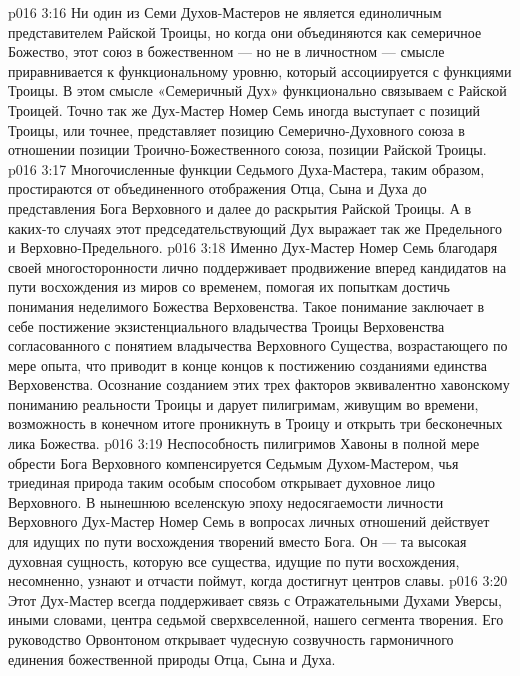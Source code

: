 \vs p016 3:16 Ни один из Семи Духов\hyp{}Мастеров не является единоличным представителем Райской Троицы, но когда они объединяются как семеричное Божество, этот союз в божественном --- но не в личностном --- смысле приравнивается к функциональному уровню, который ассоциируется с функциями Троицы. В этом смысле «Семеричный Дух» функционально связываем с Райской Троицей. Точно так же Дух\hyp{}Мастер Номер Семь иногда выступает с позиций Троицы, или точнее, представляет позицию Семерично\hyp{}Духовного союза в отношении позиции Троично\hyp{}Божественного союза, позиции Райской Троицы.
\vs p016 3:17 Многочисленные функции Седьмого Духа\hyp{}Мастера, таким образом, простираются от объединенного отображения  Отца, Сына и Духа до представления  Бога Верховного и далее до раскрытия  Райской Троицы. А в каких\hyp{}то случаях этот председательствующий Дух выражает так же  Предельного и Верховно\hyp{}Предельного.
\vs p016 3:18 Именно Дух\hyp{}Мастер Номер Семь благодаря своей многосторонности лично поддерживает продвижение вперед кандидатов на пути восхождения из миров со временем, помогая их попыткам достичь понимания неделимого Божества Верховенства. Такое понимание заключает в себе постижение экзистенциального владычества Троицы Верховенства\bibemph{,} согласованного с понятием владычества Верховного Существа, возрастающего по мере опыта, что приводит в конце концов к постижению созданиями единства Верховенства. Осознание созданием этих трех факторов эквивалентно хавонскому пониманию реальности Троицы и дарует пилигримам, живущим во времени, возможность в конечном итоге проникнуть в Троицу и открыть три бесконечных лика Божества.
\vs p016 3:19 Неспособность пилигримов Хавоны в полной мере обрести Бога Верховного компенсируется Седьмым Духом\hyp{}Мастером, чья триединая природа таким особым способом открывает духовное лицо Верховного. В нынешнюю вселенскую эпоху недосягаемости личности Верховного Дух\hyp{}Мастер Номер Семь в вопросах личных отношений действует для идущих по пути восхождения творений вместо Бога. Он --- та высокая духовная сущность, которую все существа, идущие по пути восхождения, несомненно, узнают и отчасти поймут, когда достигнут центров славы.
\vs p016 3:20 Этот Дух\hyp{}Мастер всегда поддерживает связь с Отражательными Духами Уверсы, иными словами, центра седьмой сверхвселенной, нашего сегмента творения. Его руководство Орвонтоном открывает чудесную созвучность гармоничного единения божественной природы Отца, Сына и Духа.
